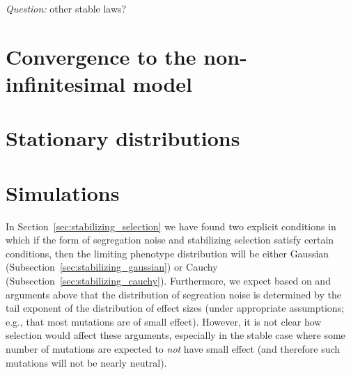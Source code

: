 \documentclass{article}
\theoremstyle{remark}
\theoremstyle{definition}
\begin{document}

\bigskip

\noindent\emph{Question:} other stable laws?


\section{Convergence to the non-infinitesimal model}  %

\section{Stationary distributions}  %

\section{Simulations}  %

In Section~\ref{sec:stabilizing_selection}
we have found two explicit conditions in which
if the form of segregation noise and stabilizing selection
satisfy certain conditions,
then the limiting phenotype distribution
will be either Gaussian (Subsection~\ref{sec:stabilizing_gaussian})
or Cauchy (Subsection~\ref{sec:stabilizing_cauchy}).
Furthermore, we expect based on
\citet{barton2017infinitesimal} and arguments above
that the distribution of segreation noise
is determined by the tail exponent of the distribution of effect sizes
(under appropriate assumptions; e.g., that most mutations are of small effect).
However, it is not clear how selection would affect these arguments,
especially in the stable case where some number of mutations are expected to
\emph{not} have small effect (and therefore such mutations will not be nearly neutral).
\end{document}
